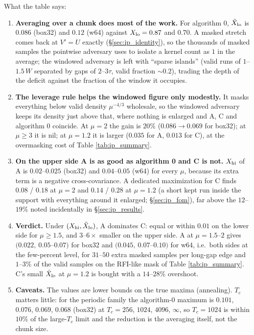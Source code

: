 \documentclass{article}
\numberwithin{equation}{section}   %
\begin{document}
\medskip\noindent What the table says:
\begin{enumerate}
\item {\bf Averaging over a chunk does most of the work.}  For algorithm 0, $\tilde X_{\rm lo}$ is
$0.086$ (box32) and $0.12$ (w64) against $X_{\rm lo} = 0.87$ and $0.70$.  A masked stretch comes back at
$V' = U$ exactly (\S\ref{sec:ip_identity}), so the thousands of masked samples the pointwise adversary
uses to isolate a kernel count as $1$ in the average; the windowed adversary is left with ``sparse
islands'' (valid runs of $1$--$1.5\,W$ separated by gaps of $2$--$3\tau$, valid fraction $\sim 0.2$),
trading the depth of the deficit against the fraction of the window it occupies.
\item {\bf The leverage rule helps the windowed figure only modestly.}  It masks everything below
valid density $\mu^{-4/3}$ wholesale, so the windowed adversary keeps its density just above that, where
nothing is enlarged and A, C and algorithm 0 coincide.  At $\mu = 2$ the gain is $20\%$
($0.086 \rightarrow 0.069$ for box32); at $\mu \ge 3$ it is nil; at $\mu = 1.2$ it is larger
($0.035$ for A, $0.013$ for C), at the overmasking cost of Table \ref{tab:ip_summary}.
\item {\bf On the upper side A is as good as algorithm 0 and C is not.}  $X_{\rm hi}$ of A is
$0.02$--$0.025$ (box32) and $0.04$--$0.05$ (w64) for every $\mu$, because its extra term is a negative
cross-covariance.  A dedicated maximization for C finds $0.08$ / $0.18$ at $\mu = 2$ and $0.14$ / $0.28$
at $\mu = 1.2$ (a short kept run inside the support with everything around it enlarged;
\S\ref{sec:ip_fom}), far above the $12$--$19\%$ noted incidentally in \S\ref{sec:ip_results}.
\item {\bf Verdict.}  Under $(X_{\rm hi}, \tilde X_{\rm lo})$, A dominates C: equal or within $0.01$ on
the lower side for $\mu \ge 1.5$, and $3$--$6\times$ smaller on the upper side.  A at $\mu = 1.5$--$2$
gives $(0.022,\ 0.05$--$0.07)$ for box32 and $(0.045,\ 0.07$--$0.10)$ for w64, i.e.\ both sides at the
few-percent level, for $31$--$50$ extra masked samples per long-gap edge and $1$--$3\%$ of the valid
samples on the RFI-like mask of Table \ref{tab:ip_summary}.  C's small $\tilde X_{\rm lo}$ at $\mu = 1.2$
is bought with a $14$--$28\%$ overshoot.
\item {\bf Caveats.}  The values are lower bounds on the true maxima (annealing).  $T_c$ matters
little: for the periodic family the algorithm-0 maximum is $0.101$, $0.076$, $0.069$, $0.068$ (box32) at
$T_c = 256$, $1024$, $4096$, $\infty$, so $T_c = 1024$ is within $10\%$ of the large-$T_c$ limit and the
reduction is the averaging itself, not the chunk size.
\end{enumerate}
\end{document}
